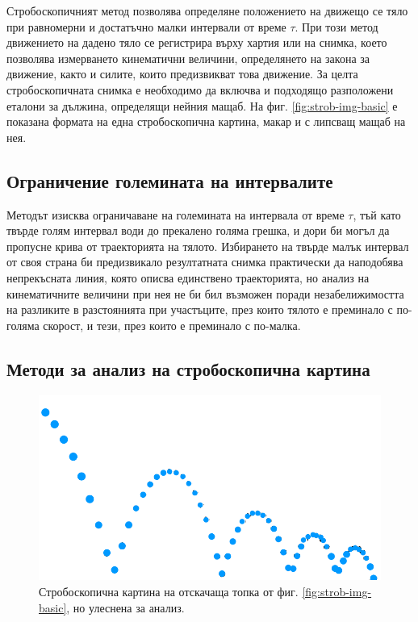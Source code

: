 \documentclass[12pt]{article}
\begin{document}
Стробоскопичният метод позволява определяне положението на движещо се тяло при равномерни и достатъчно малки интервали от време \(\tau\). При този метод движението на дадено тяло се регистрира върху хартия или на снимка, което позволява измерването кинематични величини, определянето на закона за движение, както и силите, които предизвикват това движение. За целта стробоскопичната снимка е необходимо да включва и подходящо разположени еталони за дължина, определящи нейния мащаб. На фиг. \ref{fig:strob-img-basic} е показана формата на една стробоскопична картина, макар и с липсващ мащаб на нея.

\subsection{Ограничение големината на интервалите}\label{sec:time-interval-limit}
Методът изисква ограничаване на големината на интервала от време \(\tau\), тъй като твърде голям интервал води до прекалено голяма грешка, и дори би могъл да пропусне крива от траекторията на тялото. Избирането на твърде малък интервал от своя страна би предизвикало резултатната снимка практически да наподобява непрекъсната линия, която описва единствено траекторията, но анализ на кинематичните величини при нея не би бил възможен поради незабелижимостта на разликите в разстоянията при участъците, през които тялото е преминало с по-голяма скорост, и тези, през които е преминало с по-малка.

\subsection{Методи за анализ на стробоскопична картина}

\begin{figure}
\centering
\includegraphics[width=1\textwidth]{images/stroboscopic-inv-img-blue.png}
\caption{\label{fig:strob-img-inverted} Стробоскопична картина на отскачаща топка от фиг. \ref{fig:strob-img-basic}, но улеснена за анализ.}
\end{figure}
\end{document}
